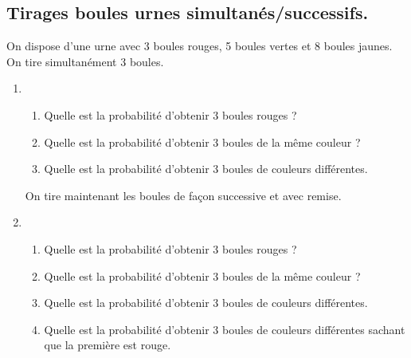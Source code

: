 \subsection{Tirages boules urnes simultanés/successifs. }


\begin{exercice}
On dispose d'une urne avec 3 boules rouges, 5 boules vertes et 8 boules jaunes. 
On tire simultanément 3 boules.
\begin{enumerate}

\item 
\begin{enumerate}
\item Quelle est la probabilité d'obtenir 3 boules rouges ?
\item Quelle est la probabilité d'obtenir 3 boules de la même couleur ?
\item Quelle est la probabilité d'obtenir 3 boules de couleurs différentes. \\
\end{enumerate}
On tire maintenant les boules de façon successive et avec remise. 
\item 
\begin{enumerate}
\item Quelle est la probabilité d'obtenir 3 boules rouges ?
\item Quelle est la probabilité d'obtenir 3 boules de la même couleur ?
\item Quelle est la probabilité d'obtenir 3 boules de couleurs différentes. 
\item Quelle est la probabilité d'obtenir 3 boules de couleurs différentes sachant que la première est rouge. 
\end{enumerate}
\end{enumerate} 

\end{exercice}



